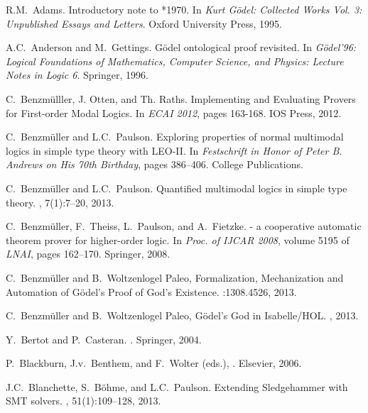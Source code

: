 \documentclass{llncs}
\begin{document}

%
\begin{thebibliography}{10}

R.M.~Adams.
\newblock Introductory note to *1970.
\newblock In {\em {Kurt G\"odel: Collected Works Vol. 3: Unpublished Essays and
  Letters}}. Oxford University Press, 1995.

A.C.~Anderson and M.~Gettings.
\newblock G\"odel ontological proof revisited.
\newblock In {\em {G\"odel'96: Logical Foundations of Mathematics, Computer
  Science, and Physics: Lecture Notes in Logic 6}}. {Springer}, 1996.

C.~Benzm{\"u}lller, J. Otten, and Th. Raths.
\newblock Implementing and Evaluating Provers for First-order Modal
Logics. 
\newblock In {\em ECAI 2012}, pages 163-168. IOS Press, 2012.

C.~Benzm{\"u}ller and L.C.~Paulson.
\newblock Exploring properties of normal multimodal logics in simple type
  theory with {LEO-II}.
\newblock In {\em {Festschrift in Honor of {Peter B. Andrews} on His 70th
  Birthday}}, pages 386--406. College Publications.

C.~Benzm{\"u}ller and L.C.~Paulson.
\newblock Quantified multimodal logics in simple type theory.
,
  7(1):7--20, 2013.

C.~Benzm{\"u}ller, F.~Theiss, L.~Paulson, and A.~Fietzke.
 - a cooperative automatic theorem prover for higher-order
  logic.
\newblock In {\em Proc. of IJCAR 2008}, volume 5195 of {\em LNAI}, pages
  162--170. Springer, 2008.

C.~Benzm{\"u}ller and B.~Woltzenlogel Paleo,
\newblock Formalization, Mechanization and Automation of G{\"o}del's Proof of God's Existence.
:1308.4526, 2013.

C.~Benzm{\"u}ller and B.~Woltzenlogel Paleo,
\newblock G{\"o}del's God in Isabelle/HOL. 
, 2013.

Y.~Bertot and P.~Casteran.
.
\newblock Springer, 2004.

P.~Blackburn, J.v.~Benthem, and F.~Wolter (eds.), . Elsevier, 2006.

J.C.~Blanchette, S.~B\"ohme, and L.C.~Paulson.
\newblock Extending {Sledgehammer} with {SMT} solvers.
, 51(1):109--128, 2013.


\end{thebibliography}
\end{document}
